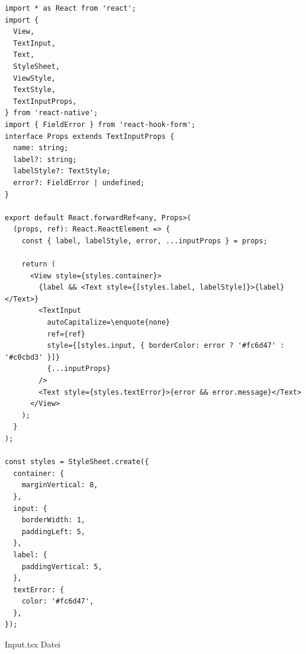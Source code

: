  




\begin{listing}[H]
	\label{lst:quelltext8}
    \begin{verbatim}
import * as React from 'react';
import {
  View,
  TextInput,
  Text,
  StyleSheet,
  ViewStyle,
  TextStyle,
  TextInputProps,
} from 'react-native';
import { FieldError } from 'react-hook-form';
interface Props extends TextInputProps {
  name: string;
  label?: string;
  labelStyle?: TextStyle;
  error?: FieldError | undefined;
}

export default React.forwardRef<any, Props>(
  (props, ref): React.ReactElement => {
	const { label, labelStyle, error, ...inputProps } = props;

	return (
	  <View style={styles.container}>
		{label && <Text style={[styles.label, labelStyle]}>{label}</Text>}
		<TextInput
		  autoCapitalize=\enquote{none}
		  ref={ref}
		  style={[styles.input, { borderColor: error ? '#fc6d47' : '#c0cbd3' }]}
		  {...inputProps}
		/>
		<Text style={styles.textError}>{error && error.message}</Text>
	  </View>
	);
  }
);

const styles = StyleSheet.create({
  container: {
	marginVertical: 8,
  },
  input: {
	borderWidth: 1,
	paddingLeft: 5,
  },
  label: {
	paddingVertical: 5,
  },
  textError: {
	color: '#fc6d47',
  },
});	
\end{verbatim}


\caption[Input.tsx]{Input.tsx Datei}
\end{listing}


